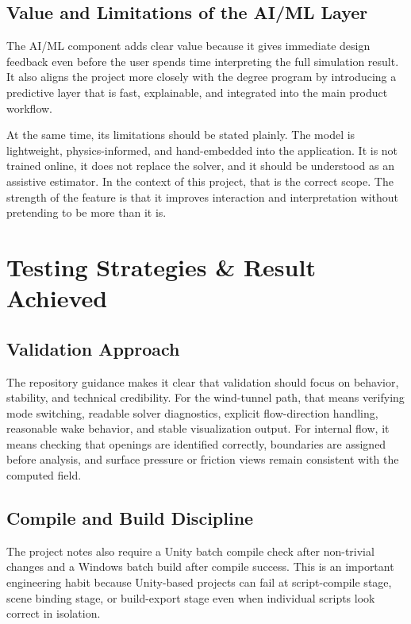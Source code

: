 \documentclass[12pt,a4paper,titlepage]{report}
\begin{document}
\section{Value and Limitations of the AI/ML Layer}
The AI/ML component adds clear value because it gives immediate design feedback even before the user spends time interpreting the full simulation result. It also aligns the project more closely with the degree program by introducing a predictive layer that is fast, explainable, and integrated into the main product workflow.

At the same time, its limitations should be stated plainly. The model is lightweight, physics-informed, and hand-embedded into the application. It is not trained online, it does not replace the solver, and it should be understood as an assistive estimator. In the context of this project, that is the correct scope. The strength of the feature is that it improves interaction and interpretation without pretending to be more than it is.

\chapter{Testing Strategies \& Result Achieved}
\section{Validation Approach}
The repository guidance makes it clear that validation should focus on behavior, stability, and technical credibility. For the wind-tunnel path, that means verifying mode switching, readable solver diagnostics, explicit flow-direction handling, reasonable wake behavior, and stable visualization output. For internal flow, it means checking that openings are identified correctly, boundaries are assigned before analysis, and surface pressure or friction views remain consistent with the computed field.

\section{Compile and Build Discipline}
The project notes also require a Unity batch compile check after non-trivial changes and a Windows batch build after compile success. This is an important engineering habit because Unity-based projects can fail at script-compile stage, scene binding stage, or build-export stage even when individual scripts look correct in isolation.
\end{document}
